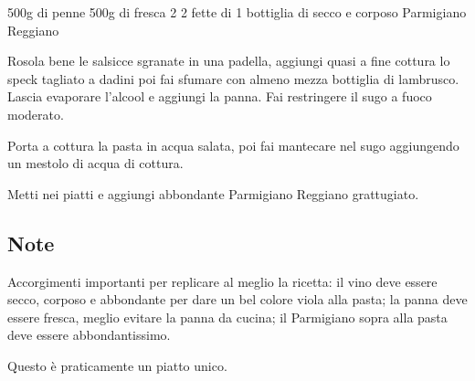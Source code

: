 \begin{ingreds}
	500g di penne
	500g di  fresca
	2 
	2 fette di 
	1 bottiglia di  secco e corposo
	Parmigiano Reggiano

\end{ingreds}

\begin{method}
Rosola bene le salsicce sgranate in una padella, aggiungi quasi a fine cottura lo speck tagliato a dadini poi fai sfumare con almeno mezza bottiglia di lambrusco. Lascia evaporare l'alcool e aggiungi la panna. Fai restringere il sugo a fuoco moderato.

Porta a cottura la pasta in acqua salata, poi fai mantecare nel sugo aggiungendo un mestolo di acqua di cottura.

Metti nei piatti e aggiungi abbondante Parmigiano Reggiano grattugiato.

\end{method}
\subsection*{Note}
	Accorgimenti importanti per replicare al meglio la ricetta: il vino deve essere secco, corposo e abbondante per dare un bel colore viola alla pasta; la panna deve essere fresca, meglio evitare la panna da cucina; il Parmigiano sopra alla pasta deve essere abbondantissimo.

	Questo è praticamente un piatto unico.


